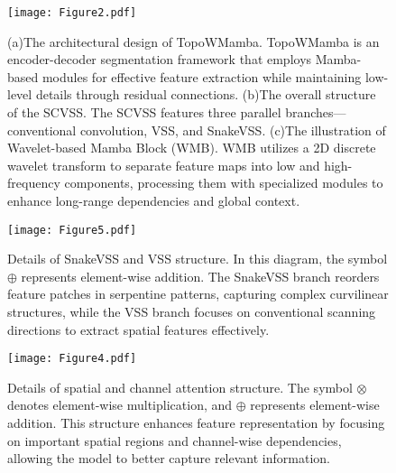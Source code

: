 \begin{figure*}[htbp]
\setlength{\abovecaptionskip}{2pt}
\setlength{\belowcaptionskip}{0pt}
\centering
\texttt{[image: Figure2.pdf]}
\caption{(a)The architectural design of TopoWMamba. TopoWMamba is an encoder-decoder segmentation framework that employs Mamba-based modules for effective feature extraction while maintaining low-level details through residual connections. (b)The overall structure of the SCVSS. The SCVSS features three parallel branches—conventional convolution, VSS, and SnakeVSS. (c)The illustration of Wavelet-based Mamba Block (WMB). WMB utilizes a 2D discrete wavelet transform to separate feature maps into low and high-frequency components, processing them with specialized modules to enhance long-range dependencies and global context.}
\label{fig:fig2}
\end{figure*}

\begin{figure}[htbp]
\centering
\texttt{[image: Figure5.pdf]}
\caption{Details of SnakeVSS and VSS structure. In this diagram, the symbol $\oplus$ represents element-wise addition. The SnakeVSS branch reorders feature patches in serpentine patterns, capturing complex curvilinear structures, while the VSS branch focuses on conventional scanning directions to extract spatial features effectively.}
\label{fig:fig4}
\end{figure}



\begin{figure}[htbp]
\setlength{\abovecaptionskip}{2pt}
\setlength{\belowcaptionskip}{0pt}
\centering
\texttt{[image: Figure4.pdf]}
\caption{Details of spatial and channel attention structure. The symbol $\otimes$ denotes element-wise multiplication, and $\oplus$ represents element-wise addition.  This structure enhances feature representation by focusing on important spatial regions and channel-wise dependencies, allowing the model to better capture relevant information.}
\label{fig:fig5}
\end{figure}

% 


%